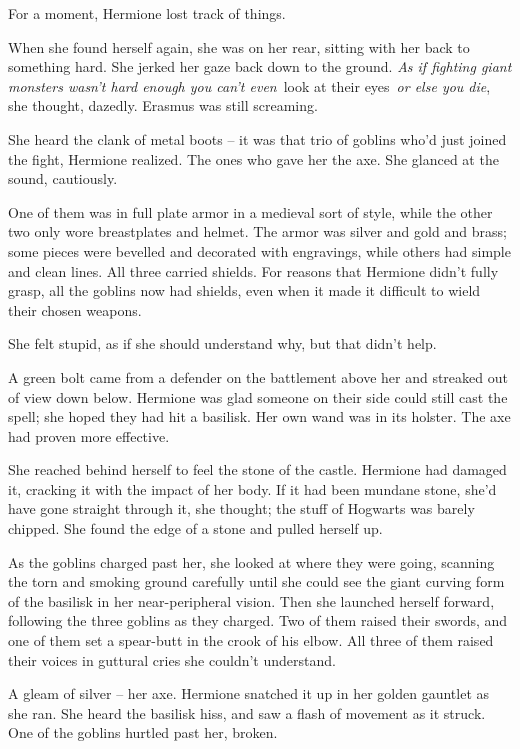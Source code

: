 For a moment, Hermione lost track of things.

When she found herself again, she was on her rear, sitting with her back
to something hard. She jerked her gaze back down to the ground. \emph{As
if fighting giant monsters wasn't hard enough you can't even}~look at
their eyes~\emph{or else you die}, she thought, dazedly. Erasmus was
still screaming.

She heard the clank of metal boots -- it was that trio of goblins who'd
just joined the fight, Hermione realized. The ones who gave her the axe.
She glanced at the sound, cautiously.

One of them was in full plate armor in a medieval sort of style, while
the other two only wore breastplates and helmet. The armor was silver
and gold and brass; some pieces were bevelled and decorated with
engravings, while others had simple and clean lines. All three carried
shields. For reasons that Hermione didn't fully grasp, all the goblins
now had shields, even when it made it difficult to wield their chosen
weapons.

She felt stupid, as if she should understand why, but that didn't help.

A green bolt came from a defender on the battlement above her and
streaked out of view down below. Hermione was glad someone on their side
could still cast the spell; she hoped they had hit a basilisk. Her own
wand was in its holster. The axe had proven more effective.

She reached behind herself to feel the stone of the castle. Hermione had
damaged it, cracking it with the impact of her body. If it had been
mundane stone, she'd have gone straight through it, she thought; the
stuff of Hogwarts was barely chipped. She found the edge of a stone and
pulled herself up.

As the goblins charged past her, she looked at where they were going,
scanning the torn and smoking ground carefully until she could see the
giant curving form of the basilisk in her near-peripheral vision. Then
she launched herself forward, following the three goblins as they
charged. Two of them raised their swords, and one of them set a
spear-butt in the crook of his elbow. All three of them raised their
voices in guttural cries she couldn't understand.

A gleam of silver -- her axe. Hermione snatched it up in her golden
gauntlet as she ran. She heard the basilisk hiss, and saw a flash of
movement as it struck. One of the goblins hurtled past her, broken.

